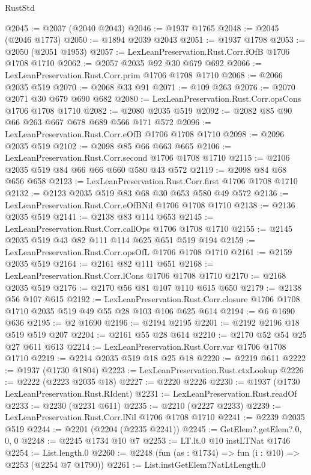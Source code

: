 \begin{lexlean}{RustStd}
\begin{coremodule}
{\begin{coremodule}
{{{{{{{{{{{{{@2045 := @2037 (@2040 @2043)
@2046 := @1937 @1765
@2048 := @2045 (@2046 @1773)
@2050 := @1894 @2039 @2043
@2051 := @1937 @1798
@2053 := @2050 (@2051 @1953)
@2057 := LexLeanPreservation.Rust.Corr.fOfB @1706 @1708 @1710
@2062 := @2057 @2035 @92 @30 @679 @692
@2066 := LexLeanPreservation.Rust.Corr.prim @1706 @1708 @1710
@2068 := @2066 @2035 @519
@2070 := @2068 @33 @91
@2071 := @109 @263
@2076 := @2070 @2071 @30 @679 @690 @682
@2080 := LexLeanPreservation.Rust.Corr.opsCons @1706 @1708 @1710
@2082 := @2080 @2035 @519
@2092 := @2082 @85 @90 @66 @263 @667 @678 @689 @566 @171 @572
@2096 := LexLeanPreservation.Rust.Corr.eOfB @1706 @1708 @1710
@2098 := @2096 @2035 @519
@2102 := @2098 @85 @66 @663 @665
@2106 := LexLeanPreservation.Rust.Corr.second @1706 @1708 @1710
@2115 := @2106 @2035 @519 @84 @66 @66 @660 @580 @43 @572
@2119 := @2098 @84 @68 @656 @658
@2123 := LexLeanPreservation.Rust.Corr.first @1706 @1708 @1710
@2132 := @2123 @2035 @519 @83 @68 @30 @653 @580 @49 @572
@2136 := LexLeanPreservation.Rust.Corr.eOfBNil @1706 @1708 @1710
@2138 := @2136 @2035 @519
@2141 := @2138 @83 @114 @653
@2145 := LexLeanPreservation.Rust.Corr.callOps @1706 @1708 @1710
@2155 := @2145 @2035 @519 @43 @82 @111 @114 @625 @651 @519 @194
@2159 := LexLeanPreservation.Rust.Corr.opsOfL @1706 @1708 @1710
@2161 := @2159 @2035 @519
@2164 := @2161 @82 @111 @651
@2168 := LexLeanPreservation.Rust.Corr.lCons @1706 @1708 @1710
@2170 := @2168 @2035 @519
@2176 := @2170 @56 @81 @107 @110 @615 @650
@2179 := @2138 @56 @107 @615
@2192 := LexLeanPreservation.Rust.Corr.closure
    @1706
    @1708
    @1710
    @2035
    @519
    @49
    @55
    @28
    @103
    @106
    @625
    @614
@2194 := @6 @1690 @636
@2195 := @2 @1690
@2196 := @2194 @2195
@2201 := @2192 @2196 @18 @519 @519 @207
@2204 := @2161 @55 @28 @614
@2210 := @2170 @52 @54 @25 @27 @611 @613
@2214 := LexLeanPreservation.Rust.Corr.var @1706 @1708 @1710
@2219 := @2214 @2035 @519 @18 @25 @18
@2220 := @2219 @611
@2222 := @1937 (@1730 @1804)
@2223 := LexLeanPreservation.Rust.ctxLookup
@2226 := @2222 (@2223 @2035 @18)
@2227 := @2220 @2226
@2230 := @1937 (@1730 LexLeanPreservation.Rust.RIdent)
@2231 := LexLeanPreservation.Rust.readOf
@2233 := @2230 (@2231 @611)
@2235 := @2210 (@2227 @2233)
@2239 := LexLeanPreservation.Rust.Corr.lNil @1706 @1708 @1710
@2241 := @2239 @2035 @519
@2244 := @2201 (@2204 (@2235 @2241))
@2245 := GetElem?.getElem?.{0, 0, 0}
@2248 := @2245 @1734 @10 @7
@2253 := LT.lt.{0} @10 instLTNat @1746
@2254 := List.length.{0}
@2260 := @2248 (fun (as : @1734) => fun (i : @10) => @2253 (@2254 @7 @1790))
@2261 := List.instGetElem?NatLtLength.{0}
}}}}}}}}}}}}}
\end{coremodule}}
\end{coremodule}
\end{lexlean}
